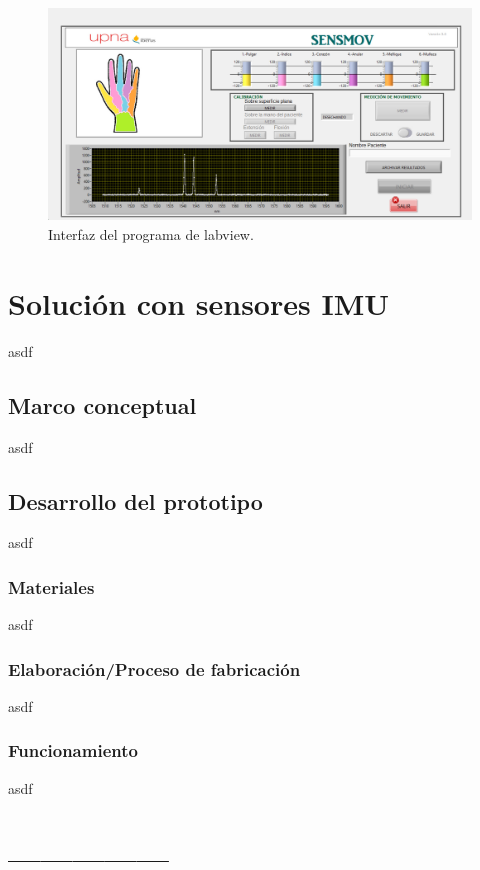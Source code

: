 \begin{figure}[H]
	\centering
	\includegraphics[width=1\textwidth]{./img/interfazSM}
	\caption{Interfaz del programa de labview.}
	\label{fig:interfaz}
\end{figure}

\section{Solución con sensores IMU}
\label{sec:IMU3}
asdf

\subsection{Marco conceptual}
\label{sec:mc3IMU}
asdf

\subsection{Desarrollo del prototipo}
\label{sec:prot3IMU}
asdf

\subsubsection{Materiales}
asdf


\subsubsection{Elaboración/Proceso de fabricación}
asdf

\subsubsection{Funcionamiento}
asdf




\section{---------------}

